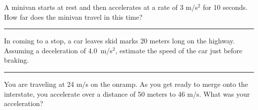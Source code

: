 \documentclass[12pt]{exam}
\begin{document}
\def\mystrut{\protect\rule[-2.2ex]{0ex}{2.2ex}} 
\qformat{ \textbf{Task \#\thequestion}
  \ifthenelse{\equal{\thequestion}{\thequestiontitle}}
    {}
    {: \emph{\thequestiontitle}}
  \mystrut  \hfill}
\begin{questions}

  \Large

\question
  A minivan starts at rest and then accelerates at a rate of 3 m/s$^2$ for 10 seconds.  How far does the minivan travel in this time?
  \vs \hrule \vs

\question
  In coming to a stop, a car leaves skid marks 20 meters long on the highway.  Assuming a deceleration of 4.0~m/s$^2$, estimate the speed of the car just before braking. 
  \vs \hrule \vs

\question
  You are traveling at 24 m/s on the onramp.  As you get ready to merge onto the interstate, you accelerate over a distance of 50 meters to 46 m/s.  What was your acceleration?
  



\end{questions}
\end{document}
